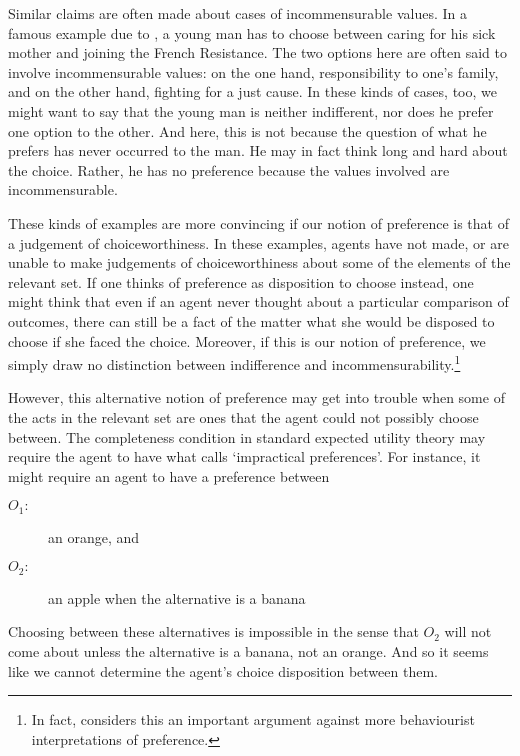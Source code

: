 Similar claims are often made about cases of incommensurable values. In a famous example due to \citet{Sartre1945}, a young man has to choose between caring for his sick mother and joining the French Resistance. The two options here are often said to involve incommensurable values: on the one hand, responsibility to one's family, and on the other hand, fighting for a just cause. In these kinds of cases, too, we might want to say that the young man is neither indifferent, nor does he prefer one option to the other. And here, this is not because the question of what he prefers has never occurred to the man. He may in fact think long and hard about the choice. Rather, he has no preference because the values involved are incommensurable.

These kinds of examples are more convincing if our notion of preference is that of a judgement of choiceworthiness. In these examples, agents have not made, or are unable to make judgements of choiceworthiness about some of the elements of the relevant set. If one thinks of preference as disposition to choose instead, one might think that even if an agent never thought about a particular comparison of outcomes, there can still be a fact of the matter what she would be disposed to choose if she faced the choice. Moreover, if this is our notion of preference, we simply draw no distinction between indifference and incommensurability.\footnote{In fact, \citet{Joyce1999} considers this an important argument against more behaviourist interpretations of preference.}

However, this alternative notion of preference may get into trouble when some of the acts in the relevant set are ones that the agent could not possibly choose between. The completeness condition in standard expected utility theory may require the agent to have what \citet{Broome1991} calls `impractical preferences'. For instance, it might require an agent to have a preference between
\begin{description}
\item[$O_1:$] an orange, and
\item[$O_2:$] an apple when the alternative is a banana
\end{description}
Choosing between these alternatives is impossible in the sense that $O_2$ will not come about unless the alternative is a banana, not an orange. And so it seems like we cannot determine the agent's choice disposition between them.

